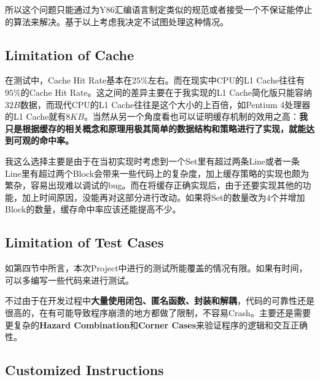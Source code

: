 所以这个问题只能通过为Y86汇编语言制定类似的规范或者接受一个不保证能停止的算法来解决。基于以上考虑我决定不试图处理这种情况。

\subsection{Limitation of Cache}

在测试中，Cache Hit Rate基本在$25\%$左右。而在现实中CPU的L1 Cache往往有$95\%$的Cache Hit Rate。这之间的差异主要在于我实现的L1 Cache简化版只能容纳$32B$数据，而现代CPU的L1 Cache往往是这个大小的上百倍，如Pentium 4处理器的L1 Cache就有$8KB$。当然从另一个角度看也可以证明缓存机制的效用之高：{\bf 我只是根据缓存的相关概念和原理用极其简单的数据结构和策略进行了实现，就能达到可观的命中率。}

我这么选择主要是由于在当初实现时考虑到一个Set里有超过两条Line或者一条Line里有超过两个Block会带来一些代码上的复杂度，加上缓存策略的实现也颇为繁杂，容易出现难以调试的bug。而在将缓存正确实现后，由于还要实现其他的功能，加上时间原因，没能再对这部分进行改动。如果将Set的数量改为$4$个并增加Block的数量，缓存命中率应该还能提高不少。

\subsection{Limitation of Test Cases}

如第四节中所言，本次Project中进行的测试所能覆盖的情况有限。如果有时间，可以多编写一些代码来进行测试。

不过由于在开发过程中{\bf 大量使用闭包、匿名函数、封装和解耦}，代码的可靠性还是很高的，在有可能导致程序崩溃的地方都做了限制，不容易Crash。主要还是需要更复杂的{\bf Hazard Combination}和{\bf Corner Cases}来验证程序的逻辑和交互正确性。

\subsection{Customized Instructions}